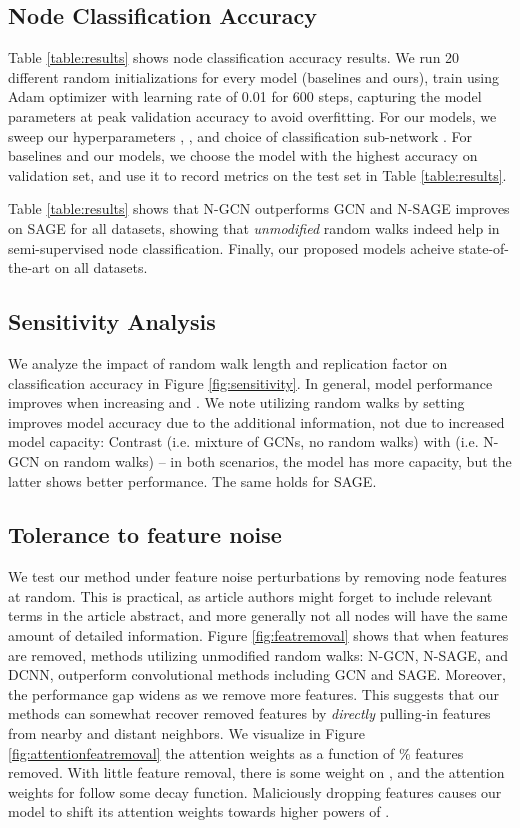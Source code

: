 \subsection{Node Classification Accuracy}
Table \ref{table:results} shows node classification accuracy results.
We run 20 different random initializations for every model (baselines and ours), train using Adam optimizer \citep{adam} with learning rate of 0.01 for 600 steps, capturing the model parameters at peak validation accuracy to avoid overfitting.
For our models, we sweep our hyperparameters , , and choice of classification sub-network . For baselines and our models, we choose the model with the highest accuracy on validation set, and use it to record metrics on the test set in Table \ref{table:results}.

Table \ref{table:results} shows that N-GCN outperforms GCN \citep{kipf} and N-SAGE improves on SAGE for all datasets, showing that \textit{unmodified} random walks indeed help in semi-supervised node classification. Finally, our proposed models acheive state-of-the-art on all datasets.


\subsection{Sensitivity Analysis}
We analyze the impact of random walk length  and replication factor  on classification accuracy in Figure \ref{fig:sensitivity}. In general, model performance improves when increasing  and . We note utilizing random walks by setting  improves model accuracy due to the additional information, not due to increased model capacity: Contrast  (i.e. mixture of GCNs, no random walks) with  (i.e. N-GCN on random walks) -- in both scenarios, the model has more capacity, but the latter shows better performance. The same holds for SAGE.


\subsection{Tolerance to feature noise}
We test our method under feature noise perturbations by removing node features at random. This is practical, as article authors might forget to include relevant terms in the article abstract,
and more generally not all nodes will have the same amount of detailed information.
Figure \ref{fig:featremoval} shows that when features are removed, methods utilizing unmodified random walks: N-GCN, N-SAGE, and DCNN, outperform convolutional methods including GCN and SAGE. Moreover, the performance gap widens as we remove more features. This suggests that our methods can somewhat recover removed features by \textit{directly} pulling-in features from nearby and distant neighbors.
We visualize in Figure \ref{fig:attentionfeatremoval} the attention weights as a function of \% features removed. With little feature removal, there is some weight on , and the attention weights for  follow some decay function. Maliciously dropping features causes our model to shift its attention weights towards higher powers of .


